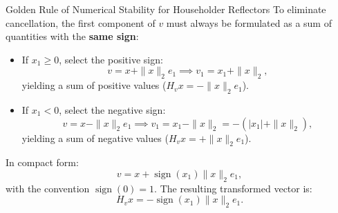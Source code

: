 \begin{noteblock}{Golden Rule of Numerical Stability for Householder Reflectors}
To eliminate cancellation, the first component of $v$ must always be formulated as a sum of quantities with the \textbf{same sign}:
\begin{itemize}
    \item If $x_1 \ge 0$, select the positive sign:
    \begin{equation}
        v = x + \|x\|_2 e_1 \implies v_1 = x_1 + \|x\|_2,
    \end{equation}
    yielding a sum of positive values ($H_v x = -\|x\|_2 e_1$).
    \item If $x_1 < 0$, select the negative sign:
    \begin{equation}
        v = x - \|x\|_2 e_1 \implies v_1 = x_1 - \|x\|_2 = -(|x_1| + \|x\|_2),
    \end{equation}
    yielding a sum of negative values ($H_v x = +\|x\|_2 e_1$).
\end{itemize}
In compact form:
\begin{equation}
    v = x + \operatorname{sign}(x_1) \|x\|_2 e_1,
    \label{eq:stable-criterion-householder-en}
\end{equation}
with the convention $\operatorname{sign}(0) = 1$. The resulting transformed vector is:
\begin{equation}
    H_v x = -\operatorname{sign}(x_1) \|x\|_2 e_1.
\end{equation}
\end{noteblock}

